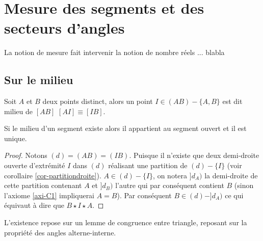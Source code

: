     \section{Mesure des segments et des secteurs d'angles}

La notion de mesure fait intervenir la notion de nombre réels ... blabla

        \subsection{Sur le milieu}

\begin{defi}[Milieu]
    Soit $A$ et $B$ deux points distinct, alors un point $I\in(AB)-\{A,B\}$ est dit milieu de $[AB]$ \ssi $[AI]\equiv [IB]$. 
\end{defi}
\begin{prop}
    Si le milieu d'un segment existe alors il appartient au segment ouvert et il est unique. 
\begin{proof}
    Notons $(d)=(AB)=(IB)$. Puisque il n'existe que deux demi-droite ouverte d'extrémité $I$ dans $(d)$ réalisant une partition de $(d)-\{I\}$ (voir corollaire \ref{cor-partitiondroite}). $A\in (d)-\{I\}$, on notera $]d_A)$ la demi-droite de cette partition contenant $A$ et $]d_B)$ l'autre qui par conséquent contient $B$ (sinon l'axiome \ref{axi-C1} impliquerai $A=B$). Par conséquent $B\in (d)-]d_A)$ ce qui équivaut à dire que $B\star I\star A$.
\end{proof}
\end{prop}
\begin{rema}
    L'existence repose sur un lemme de congruence entre triangle, reposant sur la propriété des angles alterne-interne. 
\end{rema}
